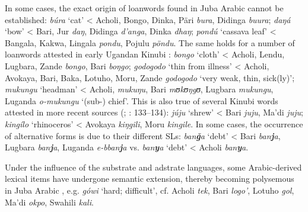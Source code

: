 \documentclass[output=paper]{langsci/langscibook}
\begin{document}
In some cases, the exact origin of loanwords found in Juba Arabic cannot be established: \textit{búra} ‘cat’ < Acholi, Bongo, Dinka, Päri \textit{bura}, Didinga \textit{buura}; \textit{daŋá} ‘bow’ < Bari, Jur \textit{daŋ}, Didinga \textit{d'anga}, Dinka \textit{dhaŋ}; \textit{pondú} ‘cassava leaf’ < Bangala, Kakwa, Lingala \textit{pondu}, Pojulu \textit{pöndu}. The same holds for a number of loanwords attested in early Ugandan Kinubi \citep{Avram2017talk}: \textit{bongo} ‘cloth’ < Acholi, Lendu, Lugbara, Zande \textit{bongo}, Bari \textit{boŋgo}; \textit{godogodo} ‘thin from illness’ < Acholi, Avokaya, Bari, Baka, Lotuho, Moru, Zande \textit{godogodo} ‘very weak, thin, sick(ly)’; \textit{mukungu} ‘headman’ < Acholi, \textit{mukuŋu}, Bari \textit{mʊkʊ}\textit{ŋgʊ}, Lugbara \textit{mukungu}, Luganda \textit{o-mukungu} ‘(sub-) chief’. This is also true of several Kinubi words attested in more recent sources (\citealt{Wellens2003}; \citealt{Nakao2012}: 133–134): \textit{júju} ‘shrew’ < Bari \textit{juju}, Ma'di \textit{juju}; \textit{kingílo} ‘rhinoceros’ < Avokaya \textit{kiŋgili}, Moru \textit{kingile}. In some cases, the occurrence of alternative forms is due to their different SLs: \textit{ban\textbf{ǧ}a} ‘debt’ < Bari \textit{ban\textbf{j}a}, Lugbara \textit{ban\textbf{j}a}, Luganda \textit{e-bban\textbf{j}a} vs. \textit{ban\textbf{y}a} ‘debt’ < Acholi \textit{ban\textbf{y}a}. 

Under the influence of the substrate and adstrate languages, some Arabic-derived lexical items have undergone semantic extension, thereby becoming polysemous in Juba Arabic \citep[136]{Nakao2012}, e.g. \textit{gówi} ‘hard; difficult’, cf. Acholi \textit{tek}, Bari \textit{logo’}, Lotuho \textit{gol}, Ma'di \textit{okpo}, Swahili \textit{kali}.
\end{document}
